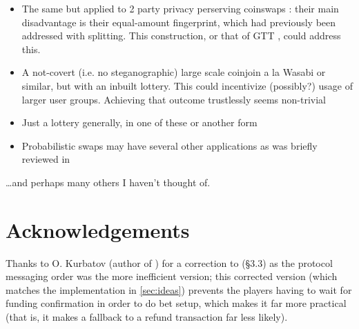 \documentclass[11pt]{article}
\begin{document}
\begin{itemize}
\item The same but applied to 2 party privacy perserving coinswaps \cite{coinswap}: their main disadvantage is their equal-amount fingerprint, which had previously been addressed with splitting. This construction, or that of GTT \cite{gerhardt2026}, could address this.
\item A not-covert (i.e. no steganographic) large scale coinjoin a la Wasabi or similar, but with an inbuilt lottery. This could incentivize (possibly?) usage of larger user groups. Achieving that outcome trustlessly seems non-trivial
\item Just a lottery generally, in one of these or another form
\item Probabilistic swaps may have several other applications as was briefly reviewed in \cite{gerhardt2026}
\end{itemize}

\ldots and perhaps many others I haven't thought of.

\section{Acknowledgements}

Thanks to O. Kurbatov (author of \cite{kurbatov2025oprand}) for a correction to (\S3.3) as the protocol messaging order was the more inefficient version; this corrected version (which matches the implementation in \ref{sec:ideas}) prevents the players having to wait for funding confirmation in order to do bet setup, which makes it far more practical (that is, it makes a fallback to a refund transaction far less likely).
\end{document}
